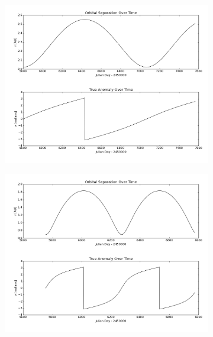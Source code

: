 \documentclass[a4paper,12pt]{article}
\begin{document}
\begin{figure}[!htbp]
\centering
\begin{subfigure}{0.5\textwidth}
  \centering
  \includegraphics[width=\linewidth]{JPLOrbitalSeparation.png}
  \caption{}
  \label{fig:sub1}
\end{subfigure}%
\begin{subfigure}{0.5\textwidth}
  \centering
  \includegraphics[width=\linewidth]{UraniaOrbitalSeparation.png}
  \caption{}
  \label{fig:sub2}
\end{subfigure}
\caption{}
\label{fig:failedFS}
\end{figure}
\end{document}

